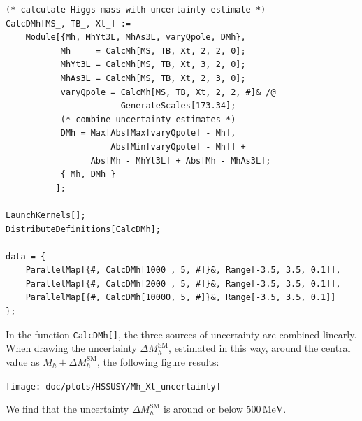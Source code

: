 \documentclass[final,3p,11pt,pdflatex]{elsarticle}
\newcommand{\code}[1]{\lstinline|#1|}  %
\newcommand{\unit}[1]{\,\text{#1}}      %
\newcommand{\SM}{\ensuremath{\text{SM}}\xspace}
\begin{document}
\begin{example}[label=ex:HSSUSY_uncertainty]
\begin{lstlisting}
(* calculate Higgs mass with uncertainty estimate *)
CalcDMh[MS_, TB_, Xt_] :=
    Module[{Mh, MhYt3L, MhAs3L, varyQpole, DMh},
           Mh     = CalcMh[MS, TB, Xt, 2, 2, 0];
           MhYt3L = CalcMh[MS, TB, Xt, 3, 2, 0];
           MhAs3L = CalcMh[MS, TB, Xt, 2, 3, 0];
           varyQpole = CalcMh[MS, TB, Xt, 2, 2, #]& /@
                       GenerateScales[173.34];
           (* combine uncertainty estimates *)
           DMh = Max[Abs[Max[varyQpole] - Mh],
                     Abs[Min[varyQpole] - Mh]] +
                 Abs[Mh - MhYt3L] + Abs[Mh - MhAs3L];
           { Mh, DMh }
          ];

LaunchKernels[];
DistributeDefinitions[CalcDMh];

data = {
    ParallelMap[{#, CalcDMh[1000 , 5, #]}&, Range[-3.5, 3.5, 0.1]],
    ParallelMap[{#, CalcDMh[2000 , 5, #]}&, Range[-3.5, 3.5, 0.1]],
    ParallelMap[{#, CalcDMh[10000, 5, #]}&, Range[-3.5, 3.5, 0.1]]
};
\end{lstlisting}%
%
In the function \code{CalcDMh[]}, the three sources of uncertainty are
combined linearly.  When drawing the uncertainty $\Delta
M_h^{\SM}$, estimated in this way, around the central value as $M_h
\pm \Delta M_h^{\SM}$, the following figure results:
\begin{center}
  \texttt{[image: doc/plots/HSSUSY/Mh\_Xt\_uncertainty]}
\end{center}
%
We find that the uncertainty $\Delta
M_h^{\SM}$ is around or below $500\unit{MeV}$.
\end{example}
\end{document}
